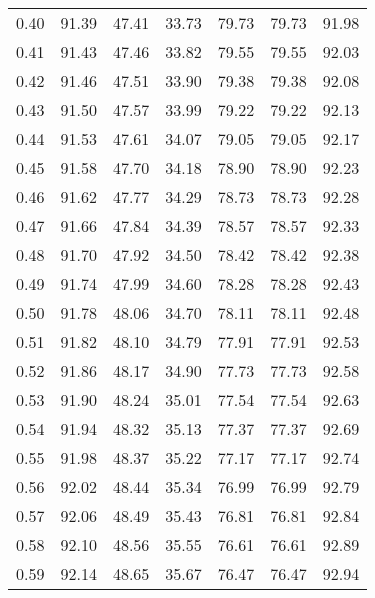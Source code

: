 \begin{tabular}{|c|c|c|c|c|c|c|}
      0.40 &     91.39 &     47.41 &      33.73 &   79.73 &      79.73 &         91.98 \\
      0.41 &     91.43 &     47.46 &      33.82 &   79.55 &      79.55 &         92.03 \\
      0.42 &     91.46 &     47.51 &      33.90 &   79.38 &      79.38 &         92.08 \\
      0.43 &     91.50 &     47.57 &      33.99 &   79.22 &      79.22 &         92.13 \\
      0.44 &     91.53 &     47.61 &      34.07 &   79.05 &      79.05 &         92.17 \\
      0.45 &     91.58 &     47.70 &      34.18 &   78.90 &      78.90 &         92.23 \\
      0.46 &     91.62 &     47.77 &      34.29 &   78.73 &      78.73 &         92.28 \\
      0.47 &     91.66 &     47.84 &      34.39 &   78.57 &      78.57 &         92.33 \\
      0.48 &     91.70 &     47.92 &      34.50 &   78.42 &      78.42 &         92.38 \\
      0.49 &     91.74 &     47.99 &      34.60 &   78.28 &      78.28 &         92.43 \\
      0.50 &     91.78 &     48.06 &      34.70 &   78.11 &      78.11 &         92.48 \\
      0.51 &     91.82 &     48.10 &      34.79 &   77.91 &      77.91 &         92.53 \\
      0.52 &     91.86 &     48.17 &      34.90 &   77.73 &      77.73 &         92.58 \\
      0.53 &     91.90 &     48.24 &      35.01 &   77.54 &      77.54 &         92.63 \\
      0.54 &     91.94 &     48.32 &      35.13 &   77.37 &      77.37 &         92.69 \\
      0.55 &     91.98 &     48.37 &      35.22 &   77.17 &      77.17 &         92.74 \\
      0.56 &     92.02 &     48.44 &      35.34 &   76.99 &      76.99 &         92.79 \\
      0.57 &     92.06 &     48.49 &      35.43 &   76.81 &      76.81 &         92.84 \\
      0.58 &     92.10 &     48.56 &      35.55 &   76.61 &      76.61 &         92.89 \\
      0.59 &     92.14 &     48.65 &      35.67 &   76.47 &      76.47 &         92.94 \\

\end{tabular}
